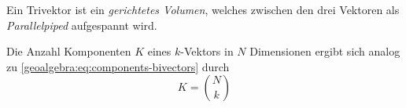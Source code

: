 {Ein Trivektor ist ein \emph{gerichtetes Volumen}, welches zwischen den drei Vektoren als \emph{Parallelpiped} aufgespannt wird.

Die Anzahl Komponenten $K$ eines $k$-Vektors in $N$ Dimensionen ergibt sich analog zu \eqref{geoalgebra:eq:components-bivectors} durch
\begin{equation}
  K = \binom{N}{k}
\end{equation}
}
